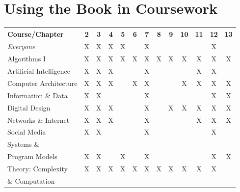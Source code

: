 \documentclass{article}
\begin{document}
\section*{Using the Book in Coursework}

\bigskip

\begin{tabular}{|l||c|c|c|c|c|c|c|c|c|c|c|c|}
\hline
{\bf Course}/{\bf Chapter}
   & 2 & 3 & 4 & 5 & 6 & 7 & 8 & 9 & 10 & 11 & 12 & 13 \\
\hline
\hline
{\em Everyone} 
   & X & X & X & X &  & X &  &  &  &  & X &  \\
\hline
Algorithms I
   & X & X & X & X & X & X & X & X & X & X & X & X \\
\hline
Artificial Intelligence
   & X & X & X &  &  & X &  &  &  & X & X &  \\
\hline
Computer Architecture 
   & X & X &  X&  & X & X &  &  & X & X & X & X \\
\hline
Information \& Data 
   & X & X &  &  &  & X &  &  &  &  & X & X \\
\hline
Digital Design 
   & X & X & X &  &  & X &  & X & X & X & X & X \\
\hline
Networks \& Internet
   & X & X & X &  &  & X &  &  &  & X & X & X \\
\hline
Social Media 
   & X & X &  &  &  & X &  &  &  &  & X &  \\
\hline
Systems \&    &  &  &  &  &  &  &  &  &  &  &  & \\
Program Models 
   & X & X &  & X &  & X &  &  &  &  & X & X \\
\hline
Theory: Complexity 
   & X & X & X & X & X & X & X & X & X & X & X &  \\
\& Computation    &  &  &  &  &  &  &  &  &  &  &  & \\
\hline
\end{tabular}
\end{document}
